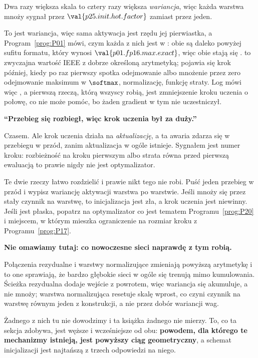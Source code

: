 \begin{fr}

Dwa razy większa skala to cztery razy większa \emph{wariancja}, więc każda
warstwa mnoży sygnał przez $\val{p25.init.hot.factor}$ zamiast przez jeden.

To jest wariancja, więc sama aktywacja jest rzędu jej pierwiastka, a
Program~\ref{prog:P01} mówi, czym każda z nich jest w : obie są
daleko powyżej sufitu formatu, który wynosi $\val{p01.fp16.max.exact}$, więc
obie stają się .  to zwyczajna wartość IEEE z dobrze
określoną arytmetyką;  pojawia się krok później, kiedy 
po raz pierwszy spotka odejmowanie albo mnożenie przez zero \dash{}
odejmowanie maksimum w $\softmax$, normalizację, funkcję straty. Log mówi więc
, a pierwszą rzeczą, którą wszyscy robią, jest zmniejszenie kroku
uczenia o połowę, co nie może pomóc, bo żaden gradient w tym nie uczestniczył.
\end{fr}

\begin{fr}
\begin{trapbox}
\textbf{\enquote{Przebieg się rozbiegł, więc krok uczenia był za duży.}}

Czasem. Ale krok uczenia działa na \emph{aktualizację}, a ta awaria zdarza się
w przebiegu w przód, zanim aktualizacja w ogóle istnieje. Sygnałem jest numer
kroku: rozbieżność na kroku pierwszym albo strata równa  przed
pierwszą ewaluacją to prawie nigdy nie jest optymalizator.

Te dwie rzeczy łatwo rozdzielić i prawie nikt tego nie robi. Puść jeden
przebieg w przód i wypisz wariancję aktywacji warstwa po warstwie. Jeśli mnoży
się przez stały czynnik na warstwę, to inicjalizacja jest zła, a krok uczenia
jest niewinny. Jeśli jest płaska, popatrz na optymalizator \dash{} co jest
tematem Programu~\ref{prog:P20} i miejscem, w którym mieszka ograniczenie na
rozmiar kroku z Programu~\ref{prog:P17}.
\end{trapbox}
\end{fr}

\begin{fr}
\begin{rigourbox}
\textbf{Nie omawiamy tutaj: co nowoczesne sieci naprawdę z tym robią.}

Połączenia rezydualne i warstwy normalizujące zmieniają powyższą arytmetykę i
to one sprawiają, że bardzo głębokie sieci w ogóle się trenują mimo
kumulowania. Ścieżka rezydualna dodaje wejście z powrotem, więc wariancja się
akumuluje, a nie mnoży; warstwa normalizująca resetuje skalę wprost, co czyni
czynnik na warstwę równym jeden z konstrukcji, a nie przez dobór wariancji
wag.

Żadnego z nich tu nie dowodzimy i ta książka żadnego nie mierzy. To, co ta
sekcja zdobywa, jest węższe i wcześniejsze od obu: \textbf{powodem, dla
którego te mechanizmy istnieją, jest powyższy ciąg geometryczny}, a schemat
inicjalizacji jest najtańszą z trzech odpowiedzi na niego.
\end{rigourbox}
\end{fr}


